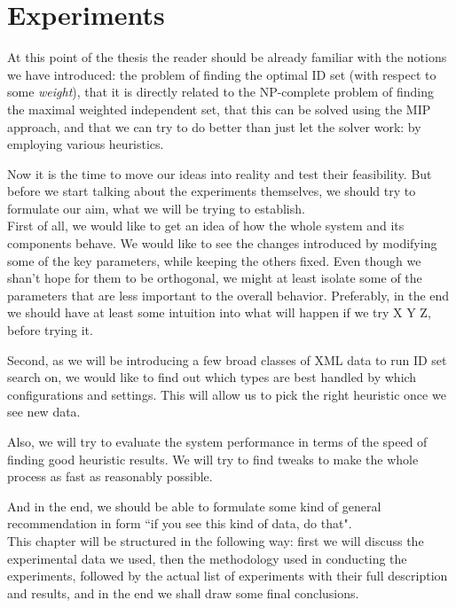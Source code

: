 \chapter{Experiments}


At this point of the thesis the reader should be already familiar with the notions we have introduced: the problem of finding the optimal ID set (with respect to some \textit{weight}), that it is directly related to the NP-complete problem of finding the maximal weighted independent set, that this can be solved using the MIP approach, and that we can try to do better than just let the solver work: by employing various heuristics.

Now it is the time to move our ideas into reality and test their feasibility. But before we start talking about the experiments themselves, we should try to formulate our aim, what we will be trying to establish.\\

First of all, we would like to get an idea of how the whole system and its components behave. We would like to see the changes introduced by modifying some of the key parameters, while keeping the others fixed. Even though we shan't hope for them to be orthogonal, we might at least isolate some of the parameters that are less important to the overall behavior. Preferably, in the end we should have at least some intuition into what will happen if we try X Y Z, before trying it.

Second, as we will be introducing a few broad classes of XML data to run ID set search on, we would like to find out which types are best handled by which configurations and settings. This will allow us to pick the right heuristic once we see new data.

Also, we will try to evaluate the system performance in terms of the speed of finding good heuristic results. We will try to find tweaks to make the whole process as fast as reasonably possible.

And in the end, we should be able to formulate some kind of general recommendation in form ``if you see this kind of data, do that".\\

This chapter will be structured in the following way: first we will discuss the experimental data we used, then the methodology used in conducting the experiments, followed by the actual list of experiments with their full description and results, and in the end we shall draw some final conclusions.

